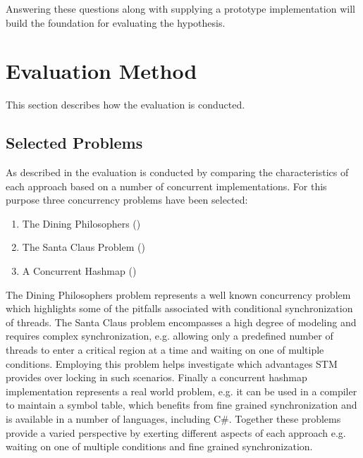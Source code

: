 Answering these questions along with supplying a prototype implementation will build the foundation for evaluating the hypothesis.

\section{Evaluation Method}\label{sec:eval_approach}
This section describes how the evaluation is conducted.
\subsection{Selected Problems}
As described in  the evaluation is conducted by comparing the characteristics of each approach based on a number of concurrent implementations. For this purpose three concurrency problems have been selected:
\begin{enumerate}
\item The Dining Philosophers ()
\item The Santa Claus Problem ()
\item A Concurrent Hashmap ()
\end{enumerate}
The Dining Philosophers problem represents a well known concurrency problem which highlights some of the pitfalls associated with conditional synchronization of threads. The Santa Claus problem encompasses a high degree of modeling and requires complex synchronization, e.g. allowing only a predefined number of threads to enter a critical region at a time and waiting on one of multiple conditions. Employing this problem helps investigate which advantages \ac{STM} provides over locking in such scenarios. Finally a concurrent hashmap implementation represents a real world problem, e.g. it can be used in a compiler to maintain a symbol table\cite{cormen2009introduction}, which benefits from fine grained synchronization and is available in a number of languages, including C\#. Together these problems provide a varied perspective by exerting different aspects of each approach e.g. waiting on one of multiple conditions and fine grained synchronization.

